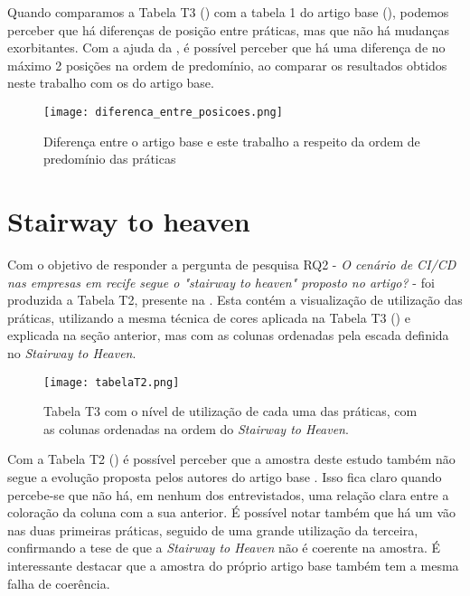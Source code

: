 Quando comparamos a Tabela T3 () com a tabela 1 do artigo base (), podemos perceber que há diferenças de posição entre práticas, mas que não há mudanças exorbitantes. Com a ajuda da , é possível perceber que há uma diferença de no máximo 2 posições na ordem de predomínio, ao comparar os resultados obtidos neste trabalho com os do artigo base. 

\begin{figure}[ht]
\begin{center}
\texttt{[image: diferenca\_entre\_posicoes.png]}
\end{center}
\caption[Diferença entre a ordem de predomínio das práticas]{
    Diferença entre o artigo base e este trabalho a respeito da ordem de predomínio das práticas
}\label{diferenca_entre_posicoes_fig}
\end{figure}

\section{Stairway to heaven}

Com o objetivo de responder a pergunta de pesquisa RQ2 - \emph{ O cenário de CI/CD nas empresas em recife segue o "stairway to heaven" proposto no artigo?} - foi produzida a Tabela T2, presente na . Esta contém a visualização de utilização das práticas, utilizando a mesma técnica de cores aplicada na Tabela T3 ()  e explicada na seção anterior, mas com as colunas ordenadas pela escada definida no \emph{Stairway to Heaven}.

\begin{figure}[ht]
\begin{center}
\texttt{[image: tabelaT2.png]}
\end{center}
\caption[Tabela T2]{
    Tabela T3 com o nível de utilização de cada uma das práticas, com as colunas ordenadas na ordem do \emph{Stairway to Heaven}.
}\label{tabela_t2}
\end{figure}

Com a Tabela T2 () é possível perceber que a amostra deste estudo também não segue a evolução proposta pelos autores do artigo base \cite{empiricalStudy2016}. Isso fica claro quando percebe-se que não há, em nenhum dos entrevistados, uma relação clara entre a coloração da coluna com a sua anterior. É possível notar também que há um vão nas duas primeiras práticas, seguido de uma grande utilização da terceira, confirmando a tese de que a \emph{Stairway to Heaven} não é coerente na amostra. É interessante destacar que a amostra do próprio artigo base também tem a mesma falha de coerência.

